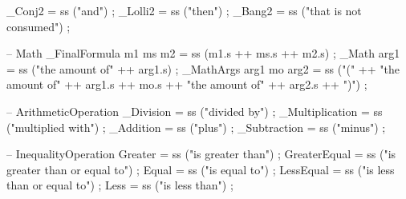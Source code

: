 \begin{lstgf}
{        _Conj2                          = ss ("and") ;
        _Lolli2                         = ss ("then") ;
        _Bang2                          = ss ("that is not consumed") ;

        -- Math
        _FinalFormula m1 ms m2          = ss (m1.s ++ ms.s ++ m2.s) ;
        _Math arg1                      = ss ("the amount of" ++ arg1.s) ;
        _MathArgs arg1 mo arg2          = ss ("(" ++ "the amount of" ++ arg1.s ++ mo.s ++ "the amount of" ++ arg2.s ++ ")") ;

        -- ArithmeticOperation
        _Division                       = ss ("divided by") ;
        _Multiplication                 = ss ("multiplied with") ;
        _Addition                       = ss ("plus") ;
        _Subtraction                    = ss ("minus") ;

        -- InequalityOperation
        Greater                         = ss ("is greater than") ;
        GreaterEqual                    = ss ("is greater than or equal to") ;
        Equal                           = ss ("is equal to") ;
        LessEqual                       = ss ("is less than or equal to") ;
        Less                            = ss ("is less than") ;
}
\end{lstgf}
